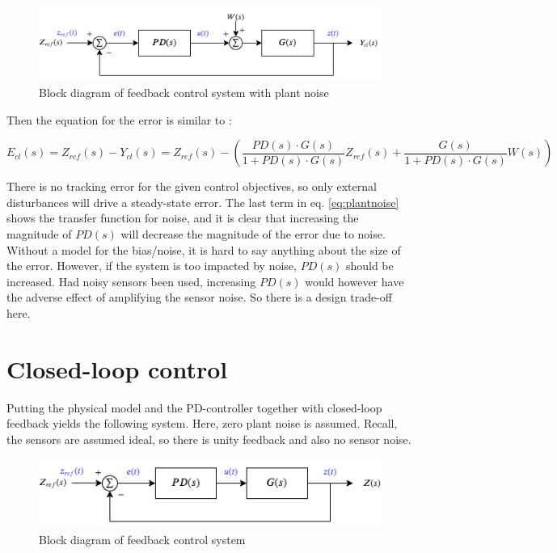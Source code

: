 \documentclass[a4paper]{report}
\begin{document}
\begin{figure}[H]
\centering
\includegraphics[width=12cm]{img/bdd_1d_noise.png}
\caption{Block diagram of feedback control system with plant noise\label{fig:bdd_1d_noise}}
\end{figure}

Then the equation for the error is similar to \cite[p. 183]{franklin}:

\begin{equation} \label{eq:plantnoise}
E_{cl}(s) = Z_{ref}(s) - Y_{cl}(s) = Z_{ref}(s) - \left( \frac{PD(s) \cdot G(s)}{1 + PD(s) \cdot G(s)} Z_{ref}(s) + \frac{G(s)}{1 + PD(s) \cdot G(s)} W(s) \right)
\end{equation}

There is no tracking error for the given control objectives, so only external disturbances will drive a steady-state error. The last term in eq. \ref{eq:plantnoise} shows the transfer function for noise, and it is clear that increasing the magnitude of $PD(s)$ will decrease the magnitude of the error due to noise. Without a model for the bias/noise, it is hard to say anything about the size of the error. However, if the system is too impacted by noise, $PD(s)$ should be increased. Had noisy sensors been used, increasing $PD(s)$ would however have the adverse effect of amplifying the sensor noise. So there is a design trade-off here.


\section{Closed-loop control}

Putting the physical model and the PD-controller together with closed-loop feedback yields the following system. Here, zero plant noise is assumed.
Recall, the sensors are assumed ideal, so there is unity feedback and also no sensor noise. 

\begin{figure}[H]
\centering
\includegraphics[width=12cm]{img/bdd_1d.png}
\caption{Block diagram of feedback control system\label{fig:bdd_1d}}
\end{figure}
\end{document}
